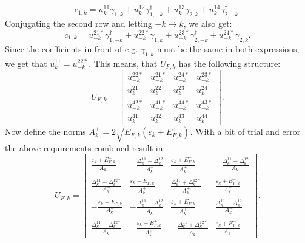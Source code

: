 \begin{equation}
c_{1,k} = u^{11}_k \gamma_{1,k} + u^{12}_k \gamma^\dagger_{1,-k} + u^{13}_k \gamma_{2,k} + u^{14}_k \gamma^\dagger_{2,-k}. \nonumber
\end{equation}
Conjugating the second row and letting $-k \to k$, we also get:
\begin{equation}
c_{1,k} = u^{21*}_{-k} \gamma^\dagger_{1,-k} + u^{22*}_{-k} \gamma_{1,k} + u^{23*}_{-k} \gamma^\dagger_{2,-k} + u^{24*}_{-k} \gamma_{2,k}. \nonumber
\end{equation}
Since the coefficients in front of e.g. $\gamma_{1,k}$ must be the same in both expressions, we get that $u^{11}_k = u^{22*}_{-k}$. This means, that $U_{F,k}$ has the following structure:
\begin{equation}
U_{F,k} = \begin{bmatrix} 
u^{22*}_{-k} & u^{21*}_{-k} & u^{24*}_{-k} & u^{23*}_{-k}           \\  
u^{21}_k 	 & u^{22}_k 	& u^{23}_k 	   & u^{24}_k               \\ 
u^{42*}_{-k} & u^{41*}_{-k} & u^{44*}_{-k} & u^{43*}_{-k}           \\ 
u^{41}_k 	 & u^{42}_k 	& u^{43}_k 	   & u^{44}_k
\end{bmatrix}. \nonumber
\end{equation}
Now define the norms $A^{\pm}_k = 2 \sqrt{ E^{\pm}_{F,k}(\varepsilon_k + E^{\pm}_{F,k}) }$. With a bit of trial and error the above requirements combined result in:
\begin{equation}
U_{F,k} = \begin{bmatrix} 
\frac{\varepsilon_k + E^{-}_{F,k}}{A^{-}_k}    & -\frac{\Delta^{11}_k + \Delta^{12}_k}{A^{+}_k} & \frac{\varepsilon_k + E^{+}_{F,k}}{A^{+}_k}     & -\frac{\Delta^{11}_k - \Delta^{12}_k}{A^{-}_k}  \\  
\frac{\Delta^{11}_k - \Delta^{12*}_k}{A^{-}_k} & \frac{\varepsilon_k + E^{+}_{F,k}}{A^{+}_k}    & \frac{\Delta^{11}_k + \Delta^{12*}_k}{A^{+}_k}  & \frac{\varepsilon_k + E^{-}_{F,k}}{A^{-}_k}     \\ 
-\frac{\varepsilon_k + E^{-}_{F,k}}{A^{-}_k}   & -\frac{\Delta^{11}_k + \Delta^{12}_k}{A^{+}_k} & \frac{\varepsilon_k + E^{+}_{F,k}}{A^{+}_k}     & \frac{\Delta^{11}_k - \Delta^{12}_k}{A^{-}_k} \\ 
\frac{\Delta^{11}_k - \Delta^{12*}_k}{A^{-}_k} & -\frac{\varepsilon_k + E^{+}_{F,k}}{A^{+}_k}   & -\frac{\Delta^{11}_k + \Delta^{12*}_k}{A^{+}_k} & \frac{\varepsilon_k + E^{-}_{F,k}}{A^{-}_k} 
\end{bmatrix}. \nonumber
\end{equation}
